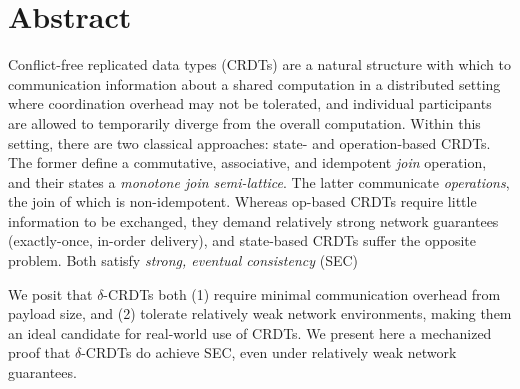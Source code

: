 \chapter{Abstract}

Conflict-free replicated data types (CRDTs) are a natural structure with which
to communication information about a shared computation in a distributed setting
where coordination overhead may not be tolerated, and individual participants
are allowed to temporarily diverge from the overall computation.  Within this
setting, there are two classical approaches: state- and operation-based CRDTs.
The former define a commutative, associative, and idempotent \textit{join}
operation, and their states a \textit{monotone join semi-lattice}. The latter
communicate \textit{operations}, the join of which is non-idempotent. Whereas
op-based CRDTs require little information to be exchanged, they demand
relatively strong network guarantees (exactly-once, in-order delivery), and
state-based CRDTs suffer the opposite problem. Both satisfy \textit{strong,
eventual consistency} (SEC)

We posit that $\delta$-CRDTs both (1) require minimal communication overhead
from payload size, and (2) tolerate relatively weak network environments, making
them an ideal candidate for real-world use of CRDTs. We present here a
mechanized proof that $\delta$-CRDTs do achieve SEC, even under relatively weak
network guarantees.
